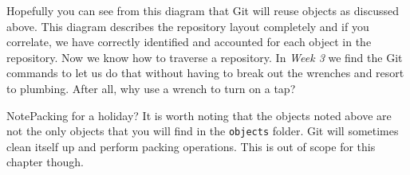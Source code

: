 Hopefully you can see from this diagram that Git will reuse objects as discussed above.  This diagram describes the repository layout completely and if you correlate, we have correctly identified and accounted for each object in the repository.  Now we know how to traverse a repository.  In \emph{Week 3} we find the Git commands to let us do that without having to break out the wrenches and resort to plumbing.  After all, why use a wrench to turn on a tap?

\begin{callout}{Note}{Packing for a holiday?}
It is worth noting that the objects noted above are not the only objects that you will find in the \texttt{objects} folder.  Git will sometimes clean itself up and perform packing operations.  This is out of scope for this chapter though.
\end{callout}

